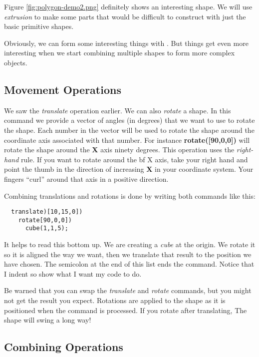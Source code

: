 
Figure \ref{fig:polygon-demo2.png} definitely shows an interesting shape. We
will use {\it extrusion} to make some parts that would be difficult to construct
with just the basic primitive shapes.


Obviously, we can form some interesting things with \osc. But things get
even more interesting when we start combining multiple shapes to form more
complex objects.

\subsection{Movement Operations}

We saw the {\it translate} operation earlier. We can also {\it rotate} a shape.
In this command we provide a vector of angles (in degrees) that we want to use
to rotate the shape. Each number in the vector will be used to rotate the shape
around the coordinate axis associated with that number. For instance {\bf
rotate([90,0,0])} will rotate the shape around the {\bf X} axis ninety degrees.
This operation uses the {\it right-hand} rule. If you want to rotate around the
{bf X} axis, take your right hand and point the thumb in the direction of
increasing {\bf X} in your coordinate system. Your fingers ``curl'' around that
axis in a positive direction.

Combining translations and rotations is done by writing both commands like
this:

\begin{lstlisting}
  translate)[10,15,0])
    rotate[90,0,0])
      cube(1,1,5);
\end{lstlisting}

It helps to read this bottom up. We are creating a {\it cube} at the origin. We
rotate it so it is aligned the way we want, then we translate that result to
the position we have chosen. The semicolon at the end of this list ends the
command. Notice that I indent so show what I want my code to do.

Be warned that you can swap the {\it translate} and {\it rotate} commands, but
you might not get the result you expect. Rotations are applied to the shape as
it is positioned when the command is processed. If you rotate after
translating, The shape will swing a long way!

\subsection{Combining Operations}

